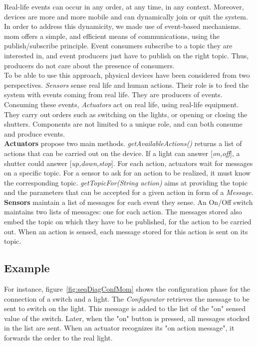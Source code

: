 Real-life events can occur in any order, at any time, in any context. Moreover, devices are more and more mobile and can dynamically join or quit the system. In order to address this dynamicity, we made use of event-based mechanisms. \gls{mom} offers a simple, and efficient means of communications, using the publish/subscribe principle. Event consumers subscribe to a topic they are interested in, and event producers just have to publish on the right topic. Thus, producers do not care about the presence of consumers.\\
To be able to use this approach, physical devices have been considered from two perspectives. {\it Sensors} sense real life and human actions. Their role is to feed the system with events coming from real life. They are producers of events. Consuming these events, {\it Actuators} act on real life, using real-life equipment. They carry out orders such as switching on the lights, or opening or closing the shutters. 
Components are not limited to a unique role, and can both consume and produce events.\\

{\bf Actuators} propose two main methods. {\it getAvailableActions()} returns a list of actions that can be carried out on the device. If a light can answer [{\it on,off}], a shutter could answer [{\it up,down,stop}]. For each action, actuators wait for messages on a specific topic. For a sensor to ask for an action to be realized, it must know the corresponding topic. {\it getTopicFor(String action)} aims at providing the topic and the parameters that can be accepted for a given action in form of a {\it Message}.\\

{\bf Sensors} maintain a list of messages for each event they sense. An On/Off switch maintains two lists of messages: one for each action. The messages stored also embed the topic on which they have to be published, for the action to be carried out. When an action is sensed, each message stored for this action is sent on its topic.


\subsection{Example}

For instance, figure~\ref{fig:seqDiagConfMom} shows the configuration phase for the connection of a switch and a light. The \textit{Configurator} retrieves the message to be sent to switch on the light. This message is added to the list of the "on" sensed value of the switch. Later, when the "on" button is pressed, all messages stocked in the list are sent. When an actuator recognizes its "on action message", it forwards the order to the real light.\\

